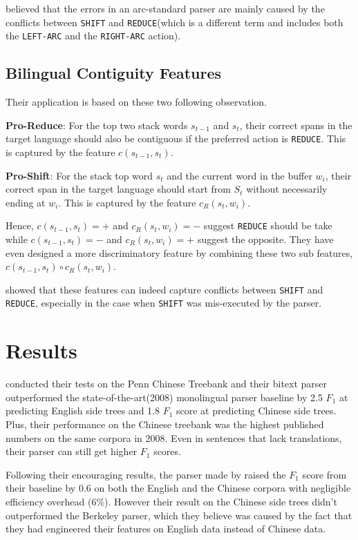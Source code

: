\documentclass[11pt]{article} %
\begin{document}
\cite{Huang:2009:BSP:1699648.1699668} believed that the errors in an arc-standard parser are mainly caused by the conflicts between \verb|SHIFT| and \verb|REDUCE|(which is a different term and includes both the \verb|LEFT-ARC| and the \verb|RIGHT-ARC| action).

\subsection{Bilingual Contiguity Features}

Their application is based on these two following observation.

\textbf{Pro-Reduce}: For the top two stack words $s_{t-1}$ and $s_t$, their correct spans in the target language should also be contiguous if the preferred action is \verb|REDUCE|. This is captured by the feature $c(s_{t-1}, s_t)$.

\textbf{Pro-Shift}: For the stack top word $s_t$ and the current word in the buffer $w_i$, their correct span in the target language should start from $S_t$ without necessarily ending at $w_i$. This is captured by the feature $c_R(s_t, w_i)$.

Hence, $c(s_{t-1}, s_t)=+$ and $c_R(s_t, w_i)=-$ suggest \verb|REDUCE| should be take while $c(s_{t-1}, s_t)=-$ and $c_R(s_t, w_i)=+$ suggest the opposite. They have even designed a more discriminatory feature by combining these two sub features, $c(s_{t-1}, s_t)\circ c_R(s_t, w_i)$.

\cite{Huang:2009:BSP:1699648.1699668} showed that these features can indeed capture conflicts between \verb|SHIFT| and \verb|REDUCE|, especially in the case when \verb|SHIFT| was mis-executed by the parser.

\section{Results}

\cite{Burkett:2008:TLB:1613715.1613828} conducted their tests on the Penn Chinese Treebank and their bitext parser outperformed the state-of-the-art(2008) monolingual parser baseline by 2.5 $F_1$ at predicting English side trees and 1.8 $F_1$ score at predicting Chinese side trees. Plus, their performance on the Chinese treebank was the highest published numbers on the same corpora in 2008. Even in sentences that lack translations, their parser can still get higher $F_1$ scores.

Following their encouraging results, the parser made by \cite{Huang:2009:BSP:1699648.1699668} raised the $F_1$ score from their baseline by 0.6 on both the English and the Chinese corpora with negligible efficiency overhead (6\%). However their result on the Chinese side trees didn't outperformed the Berkeley parser, which they believe was caused by the fact that they had engineered their features on English data instead of Chinese data.
\end{document}
